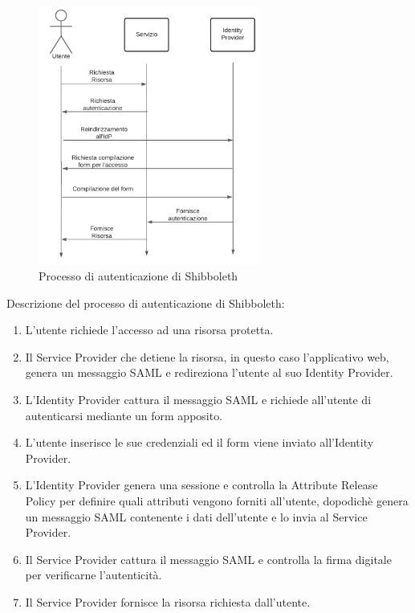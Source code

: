 \begin{figure}[H]
    \begin{center}
        \includegraphics[width=0.65\textwidth]{images/shibboleth_auth.png}
    \end{center}
    \caption{Processo di autenticazione di Shibboleth}
    \label{fig:shibboleth_auth}
\end{figure}


Descrizione del processo di autenticazione di Shibboleth:
\begin{enumerate}
    \item L'utente richiede l'accesso ad una risorsa protetta.
    \item Il Service Provider che detiene la risorsa, in questo caso l'applicativo web, genera un messaggio SAML e redireziona l'utente al suo Identity Provider.
    \item L'Identity Provider cattura il messaggio SAML e richiede all'utente di autenticarsi mediante un form apposito.
    \item L'utente inserisce le sue credenziali ed il form viene inviato all'Identity Provider.
    \item L'Identity Provider genera una sessione e controlla la Attribute Release Policy per definire quali attributi vengono forniti all'utente, dopodichè genera un messaggio SAML contenente i dati dell'utente e lo invia al Service Provider.
    \item Il Service Provider cattura il messaggio SAML e controlla la firma digitale per verificarne l'autenticità.
    \item Il Service Provider fornisce la risorsa richiesta dall'utente.
\end{enumerate}
